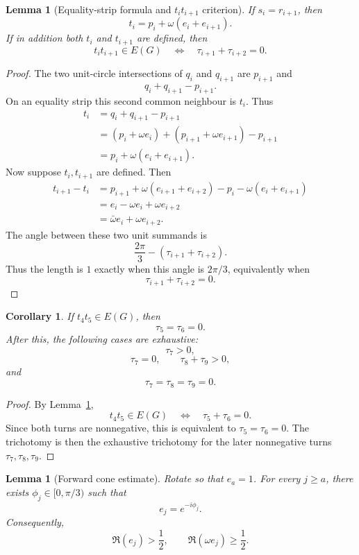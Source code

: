 \documentclass[11pt]{article}
\newtheorem{lemma}[theorem]{Lemma}
\newtheorem{corollary}[theorem]{Corollary}
\begin{document}
\begin{lemma}[Equality-strip formula and $t_it_{i+1}$ criterion]\label{lem:t-equality}
If $s_i=r_{i+1}$, then
\[
 t_i=p_i+\omega(e_i+e_{i+1}).
\]
If in addition both $t_i$ and $t_{i+1}$ are defined, then
\[
 t_it_{i+1}\in E(G)
 \quad\Longleftrightarrow\quad
 \tau_{i+1}+\tau_{i+2}=0.
\]
\end{lemma}

\begin{proof}
The two unit-circle intersections of $q_i$ and $q_{i+1}$ are $p_{i+1}$ and
\[
 q_i+q_{i+1}-p_{i+1}.
\]
On an equality strip this second common neighbour is $t_i$. Thus
\[
\begin{aligned}
 t_i&=q_i+q_{i+1}-p_{i+1}\\
 &=(p_i+\omega e_i)+(p_{i+1}+\omega e_{i+1})-p_{i+1}\\
 &=p_i+\omega(e_i+e_{i+1}).
\end{aligned}
\]
Now suppose $t_i,t_{i+1}$ are defined. Then
\[
\begin{aligned}
 t_{i+1}-t_i
 &=p_{i+1}+\omega(e_{i+1}+e_{i+2})-p_i-\omega(e_i+e_{i+1})\\
 &=e_i-\omega e_i+\omega e_{i+2}\\
 &=\bar\omega e_i+\omega e_{i+2}.
\end{aligned}
\]
The angle between these two unit summands is
\[
 \frac{2\pi}{3}-(\tau_{i+1}+\tau_{i+2}).
\]
Thus the length is $1$ exactly when this angle is $2\pi/3$, equivalently when
\[
 \tau_{i+1}+\tau_{i+2}=0.
\]
\end{proof}

\begin{corollary}\label{cor:t4t5}
If $t_4t_5\in E(G)$, then
\[
 \tau_5=\tau_6=0.
\]
After this, the following cases are exhaustive:
\[
 \tau_7>0,
\]
\[
 \tau_7=0,\qquad \tau_8+\tau_9>0,
\]
and
\[
 \tau_7=\tau_8=\tau_9=0.
\]
\end{corollary}

\begin{proof}
By Lemma~\ref{lem:t-equality},
\[
 t_4t_5\in E(G)
 \quad\Longleftrightarrow\quad
 \tau_5+\tau_6=0.
\]
Since both turns are nonnegative, this is equivalent to $\tau_5=\tau_6=0$. The trichotomy is then the exhaustive trichotomy for the later nonnegative turns $\tau_7,\tau_8,\tau_9$.
\end{proof}

\begin{lemma}[Forward cone estimate]\label{lem:cone}
Rotate so that $e_a=1$. For every $j\ge a$, there exists $\phi_j\in[0,\pi/3)$ such that
\[
 e_j=e^{-i\phi_j}.
\]
Consequently,
\[
 \Re(e_j)>\frac12,
 \qquad
 \Re(\omega e_j)\ge\frac12.
\]
\end{lemma}
\end{document}
